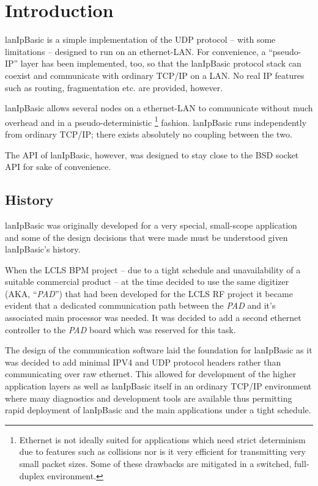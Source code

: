 \documentclass{article}
\newcommand{\lip}{lanIpBasic}
\newcommand{\ethn}{ethernet}
\newcommand{\Ethn}{Ethernet}
\newcommand{\pad}{{\em PAD}}
\begin{document}
\section{Introduction}
\lip{} is a simple implementation of the UDP protocol -- with some
limitations -- designed to run on an \ethn-LAN. For convenience,
a ``pseudo-IP'' layer has been implemented, too, so that the \lip{}
protocol stack can coexist and communicate with ordinary TCP/IP on
a LAN. No real IP features such as routing, fragmentation etc. are
provided, however.

\lip{} allows several nodes on a \ethn-LAN to communicate without much
overhead and in a pseudo-deterministic%
\footnote{
\Ethn{} is not ideally suited for applications which need strict
determinism due to features such as collisions nor is it very efficient
for transmitting very small packet sizes. Some of these drawbacks are
mitigated in a switched, full-duplex environment.
} fashion. \lip{} runs independently from ordinary TCP/IP; there exists
absolutely no coupling between the two.

The API of \lip, however, was designed to stay close to the BSD socket
API for sake of convenience.

  \subsection{History}
\label{sec:history}
\lip{} was originally developed for a very special, small-scope
application and some of the design decisions that were made must
be understood given \lip{}'s history.

When the LCLS BPM project -- due to a tight schedule and unavailability
of a suitable commercial product -- at the time decided to use the 
same digitizer (AKA, ``\pad'') that had been developed for the LCLS RF project
it became evident that a dedicated communication path between the \pad{}
and it's associated main processor was needed. It was decided to add
a second ethernet controller to the \pad{} board which was reserved
for this task.

The design of the communication software laid the foundation for \lip{}
as it was decided to add minimal IPV4 and UDP protocol headers rather than
communicating over raw ethernet. This allowed for development of the
higher application layers as well as \lip{} itself in an ordinary
TCP/IP environment where many diagnostics and development tools are
available thus permitting rapid deployment of \lip{} and the main
applications under a tight schedule.
\end{document}
